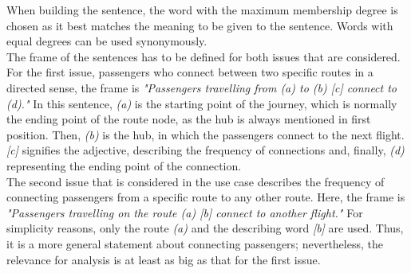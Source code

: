 \documentclass[conference]{IEEEtran}
\begin{document}
When building the sentence, the word with the maximum membership degree is chosen as it best matches the meaning to be given to the sentence. Words with equal degrees can be used synonymously.\\
The frame of the sentences has to be defined for both issues that are considered. For the first issue, passengers who connect between two specific routes in a directed sense, the frame is \newline \emph{"Passengers travelling from (a) to (b) [c] connect to (d)."} \newline In this sentence, \emph{(a)} is the starting point of the journey, which is normally the ending point of the route node, as the hub is always mentioned in first position. Then, \emph{(b)} is the hub, in which the passengers connect to the next flight. \emph{[c]} signifies the adjective, describing the frequency of connections and, finally, \emph{(d)} representing the ending point of the connection.\\
The second issue that is considered in the use case describes the frequency of connecting passengers from a specific route to any other route. Here, the frame is \newline \emph{"Passengers travelling on the route (a) [b] connect to another flight."} \newline For simplicity reasons, only the route \emph{(a)} and the describing word \emph{[b]} are used. Thus, it is a more general statement about connecting passengers; nevertheless, the relevance for analysis is at least as big as that for the first issue.
\end{document}
